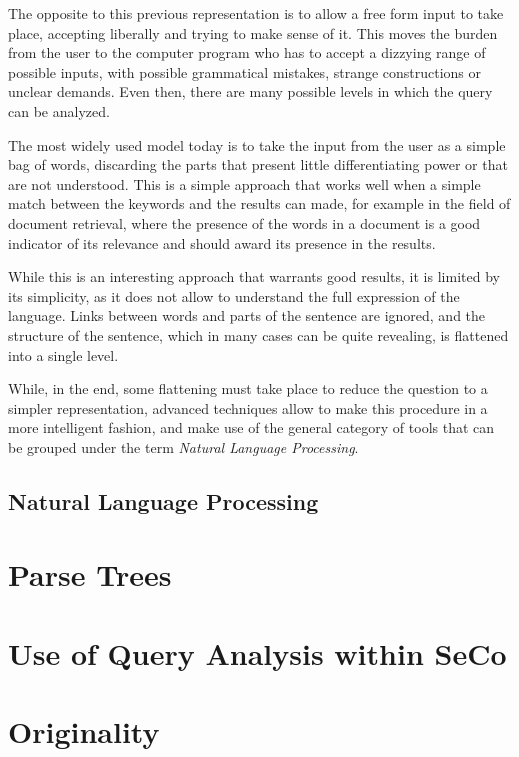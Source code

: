 The opposite to this previous representation is to allow a free form input to take place, accepting liberally and trying to make sense of it. This moves the burden from the user to the computer program who has to accept a dizzying range of possible inputs, with possible grammatical mistakes, strange constructions or unclear demands. Even then, there are many possible levels in which the query can be analyzed.

The most widely used model today is to take the input from the user as a simple bag of words, discarding the parts that present little differentiating power or that are not understood. This is a simple approach that works well when a simple match between the keywords and the results can made, for example in the field of document retrieval, where the presence of the words in a document is a good indicator of its relevance and should award its presence in the results.

While this is an interesting approach that warrants good results, it is limited by its simplicity, as it does not allow to understand the full expression of the language. Links between words and parts of the sentence are ignored, and the structure of the sentence, which in many cases can be quite revealing, is flattened into a single level.

While, in the end, some flattening must take place to reduce the question to a simpler representation, advanced techniques allow to make this procedure in a more intelligent fashion, and make use of the general category of tools that can be grouped under the term \emph{Natural Language Processing}.

\subsection{Natural Language Processing} %
\label{sub:natural_language_processing}


\section{Parse Trees} %
\label{sec:parse_trees}



\section{Use of Query Analysis within SeCo} %
\label{sec:use_of_query_analysis_within_seco}


\section{Originality} %
\label{sec:originality}


